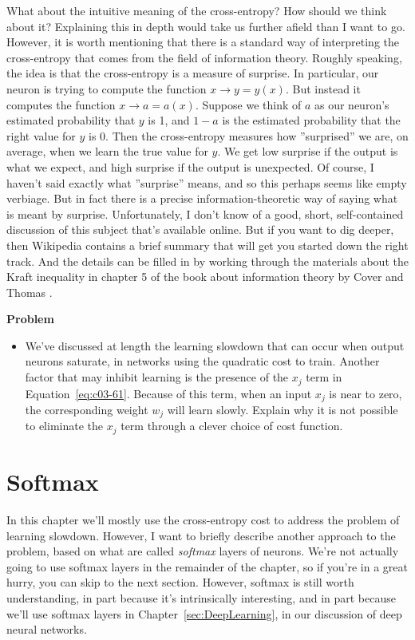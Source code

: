 What about the intuitive meaning of the cross-entropy? How should we think about it? Explaining this in depth would take us further afield than I want to go. However, it is worth mentioning that there is a standard way of interpreting the cross-entropy that comes from the field of information theory. Roughly speaking, the idea is that the cross-entropy is a measure of surprise. In particular, our neuron is trying to compute the function $x \rightarrow y=y(x)$. But instead it computes the function $x \rightarrow a=a(x)$. Suppose we think of $a$ as our neuron's estimated probability that $y$ is 1, and $1-a$ is the estimated probability that the right value for $y$ is 0. Then the cross-entropy measures how ''surprised'' we are, on average, when we learn the true value for $y$. We get low surprise if the output is what we expect, and high surprise if the output is unexpected. Of course, I haven't said exactly what ''surprise'' means, and so this perhaps seems like empty verbiage. But in fact there is a precise information-theoretic way of saying what is meant by surprise. Unfortunately, I don't know of a good, short, self-contained discussion of this subject that's available online. But if you want to dig deeper, then Wikipedia contains a brief summary \cite{wikipediaCrossentropy2019} that will get you started down the right track. And the details can be filled in by working through the materials about the Kraft inequality in chapter 5 of the book about information theory by Cover and Thomas \cite{Cover2006}.

\textbf{Problem}

\begin{itemize}
\item  We've discussed at length the learning slowdown that can occur when output neurons saturate, in networks using the quadratic cost to train. Another factor that may inhibit learning is the presence of the $x_j$ term in Equation~\ref{eq:c03-61}. Because of this term, when an input $x_j$ is near to zero, the corresponding weight $w_j$ will learn slowly. Explain why it is not possible to eliminate the $x_j$ term through a clever choice of cost function. 
\end{itemize}

\section{Softmax}
\label{sec:nielsensoftmax}

In this chapter we'll mostly use the cross-entropy cost to address the problem of learning slowdown. However, I want to briefly describe another approach to the problem, based on what are called \textit{softmax} layers of neurons. We're not actually going to use softmax layers in the remainder of the chapter, so if you're in a great hurry, you can skip to the next section. However, softmax is still worth understanding, in part because it's intrinsically interesting, and in part because we'll use softmax layers in Chapter~\ref{sec:DeepLearning}, in our discussion of deep neural networks.

